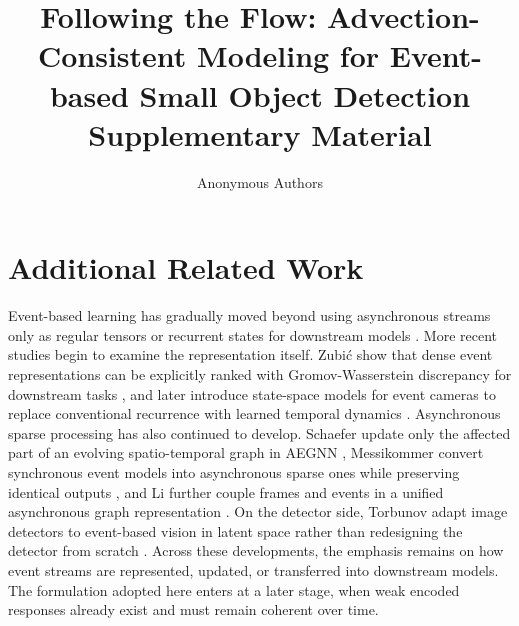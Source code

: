\documentclass[runningheads]{llncs}
\begin{document}
\title{Following the Flow: Advection-Consistent Modeling for Event-based Small Object Detection\\[0.5ex]
Supplementary Material}

\author{Anonymous Authors}

\maketitle

\section{Additional Related Work}

Event-based learning has gradually moved beyond using asynchronous streams only as regular tensors or recurrent states for downstream models \cite{gehrig2019end,gehrig2023recurrent}.
More recent studies begin to examine the representation itself.
Zubi\'c \etal show that dense event representations can be explicitly ranked with Gromov-Wasserstein discrepancy for downstream tasks \cite{zubic2023chaos}, and later introduce state-space models for event cameras to replace conventional recurrence with learned temporal dynamics \cite{zubic2024state}. 
Asynchronous sparse processing has also continued to develop.
Schaefer \etal update only the affected part of an evolving spatio-temporal graph in AEGNN \cite{schaefer2022aegnn}, Messikommer \etal convert synchronous event models into asynchronous sparse ones while preserving identical outputs \cite{messikommer2020asyncsparse}, and Li \etal further couple frames and events in a unified asynchronous graph representation \cite{li2025asynchronous}. 
On the detector side, Torbunov \etal adapt image detectors to event-based vision in latent space rather than redesigning the detector from scratch \cite{torbunov2025evrt}. 
Across these developments, the emphasis remains on how event streams are represented, updated, or transferred into downstream models. 
The formulation adopted here enters at a later stage, when weak encoded responses already exist and must remain coherent over time.
\end{document}
